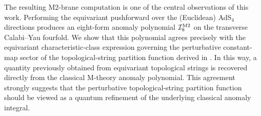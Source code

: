 \documentclass[11pt,a4paper]{article}
\def\cI{{\cal I}}
\theoremstyle{definition}
\theoremstyle{identity}
\theoremstyle{remark}
\begin{document}
The resulting M2-brane computation is one of the central observations of this work.
Performing the equivariant pushforward over the (Euclidean) AdS$_4$ directions produces an
eight-form anomaly polynomial $\cI_8^{\rm M2}$ on the transverse Calabi--Yau fourfold.
We show that this polynomial agrees precisely with the equivariant characteristic-class
expression governing the perturbative constant-map sector of the topological-string
partition function derived in
\cite{Cassia:2025aus,Cassia:2025jkr}. In this way, a quantity previously obtained from
equivariant topological strings is recovered directly from the classical M-theory anomaly
polynomial. This agreement strongly suggests that the perturbative topological-string
partition function should be viewed as a quantum refinement of the underlying classical anomaly integral.\\
\end{document}
